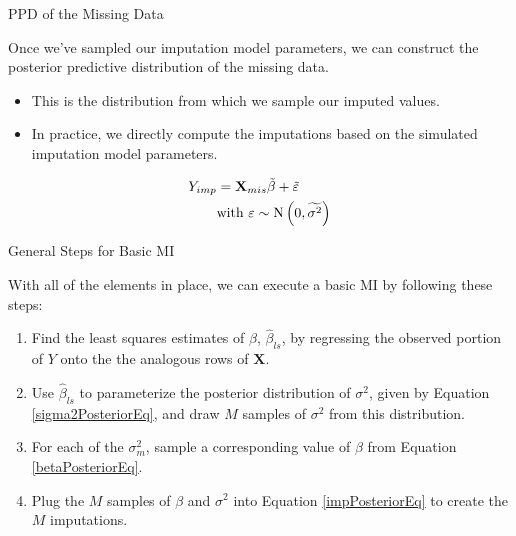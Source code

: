 \documentclass{beamer}\usepackage[]{graphicx}\usepackage[]{color}
\begin{document}
\begin{frame}{PPD of the Missing Data}
  
  Once we've sampled our imputation model parameters, we can construct the 
  posterior predictive distribution of the missing data.
  \vc
  \begin{itemize}
  \item This is the distribution from which we sample our imputed values.
    \vc
  \item In practice, we directly compute the imputations based on the simulated 
    imputation model parameters.
  \end{itemize}
  \begin{align}
    Y_{imp} &= \mathbf{X}_{mis}\tilde{\beta} + \tilde{\varepsilon} \label{impPosteriorEq}\\
    &\text{with } \varepsilon \sim \text{N} \left( 0, \widetilde{\sigma^2} \right) \notag
  \end{align}
  
\end{frame}


\begin{frame}{General Steps for Basic MI}
  
  With all of the elements in place, we can execute a basic MI by following 
  these steps:
  \vb
  \begin{enumerate}
  \item Find the least squares estimates of $\beta$, $\hat{\beta}_{ls}$, by 
    regressing the observed portion of $Y$ onto the the analogous rows of 
    $\mathbf{X}$.
    \vb
  \item Use $\hat{\beta}_{ls}$ to parameterize the posterior distribution of 
    $\sigma^2$, given by Equation \ref{sigma2PosteriorEq}, and draw $M$ samples 
    of $\sigma^2$ from this distribution.
    \vb
  \item For each of the $\sigma^2_m$, sample a corresponding value of $\beta$ 
    from Equation \ref{betaPosteriorEq}.
    \vb
  \item Plug the $M$ samples of $\beta$ and $\sigma^2$ into Equation 
    \ref{impPosteriorEq} to create the $M$ imputations.
  \end{enumerate}
  
\end{frame}

\watermarkoff %
\end{document}
